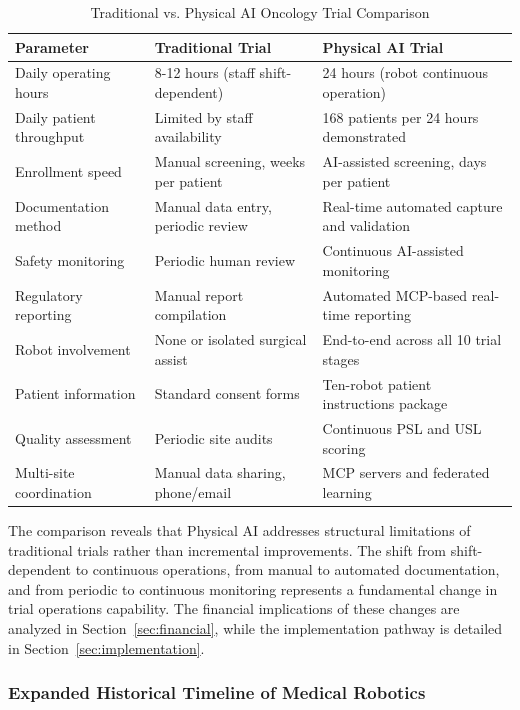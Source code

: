 \begin{table}[H]
\centering
\caption{Traditional vs. Physical AI Oncology Trial Comparison}
\label{tab:traditional-vs-pai}
\small
\begin{tabularx}{\textwidth}{l X X}
\toprule
\textbf{Parameter} & \textbf{Traditional Trial} & \textbf{Physical AI Trial} \\
\midrule
Daily operating hours & 8-12 hours (staff shift-dependent) & 24 hours (robot continuous operation) \\
Daily patient throughput & Limited by staff availability & 168 patients per 24 hours demonstrated \\
Enrollment speed & Manual screening, weeks per patient & AI-assisted screening, days per patient \\
Documentation method & Manual data entry, periodic review & Real-time automated capture and validation \\
Safety monitoring & Periodic human review & Continuous AI-assisted monitoring \\
Regulatory reporting & Manual report compilation & Automated MCP-based real-time reporting \\
Robot involvement & None or isolated surgical assist & End-to-end across all 10 trial stages \\
Patient information & Standard consent forms & Ten-robot patient instructions package \\
Quality assessment & Periodic site audits & Continuous PSL and USL scoring \\
Multi-site coordination & Manual data sharing, phone/email & MCP servers and federated learning \\
\bottomrule
\end{tabularx}
\end{table}

The comparison reveals that Physical AI addresses structural limitations of
traditional trials rather than incremental improvements. The shift from
shift-dependent to continuous operations, from manual to automated
documentation, and from periodic to continuous monitoring represents a
fundamental change in trial operations capability. The financial implications
of these changes are analyzed in Section~\ref{sec:financial}, while the
implementation pathway is detailed in Section~\ref{sec:implementation}.


\subsubsection{Expanded Historical Timeline of Medical Robotics}

